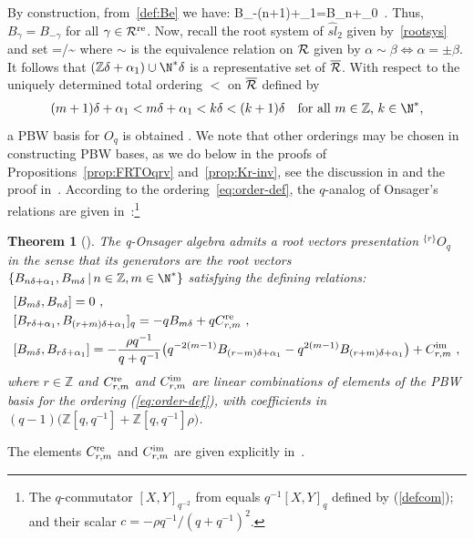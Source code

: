 \documentclass[11pt]{amsart}
\numberwithin{equation}{section}
\newtheorem{thm}{Theorem}[section]
\numberwithin{equation}{section}
\begin{document}
By construction, from~\eqref{def:Be} we have:
\beqa 
B_{-(n+1)\delta+\alpha_1}=B_{n\delta+\alpha_0}\ .\label{eq:BmBn}
\eeqa
Thus, $B_\gamma=B_{-\gamma}$ for all $\gamma\in{\mathcal R}^{\mathrm{re}}$.  Now, recall the root system of $\widehat{sl}_2$ given by~\eqref{rootsys} 
and set 
\beqa
\Rbar=\roots/\sim \label{eq:Rtilde}
\eeqa
 where $\sim$ is the equivalence relation on  ${\mathcal R}$ given by $\alpha \sim \beta \Leftrightarrow \alpha=\pm \beta$.
It follows that 
 $({\mathbb Z}\delta+\alpha_1)\cup \N^*\delta$  is a representative set of $\overline{{\mathcal R}}$. With respect to the uniquely determined total ordering $<$ on $\overline{{\mathcal R}}$ defined by
 \begin{align}\label{eq:order-def}
 	(m+1)\delta+\alpha_1<m\delta+\alpha_1<k\delta<(k+1)\delta \quad \mbox{for all $m\in {\mathbb Z}$, $k\in\N^*$},
 \end{align}  
a PBW basis for $O_q$ is obtained \cite[Thm.\,I]{BK17}. We note that other orderings may be chosen in constructing PBW bases, as we do below in the proofs of Propositions~\ref{prop:FRTOqrv} and~\ref{prop:Kr-inv},  see the discussion in \cite[Sec.\,5.1]{BK17} and the proof in~\cite[Thm.\,5.3]{Zh26b}.
According to the ordering~\eqref{eq:order-def}, the $q$-analog of Onsager's relations are given in~\cite[Thm.\,II]{BK17}:\footnote{The $q$-commutator $[X,Y]_{q^{-2}}$ from \cite{BK17} equals $q^{-1}[X,Y]_q$ defined by (\ref{defcom}); and their scalar $c = -\rho q^{-1}/(q+q^{-1})^2$.} 


\begin{thm}[\cite{BK17}]\label{thm:BK17}
  The q-Onsager algebra admits a root vectors presentation  $^{\{r\}}O_q$ in the sense that its generators are the root vectors $\{B_{n\delta+\alpha_1}, B_{m \delta} \, | \, n\in {\mathbb Z}, m\in \N^*\}$ satisfying the defining relations:
		\begin{align}
			& [B_{m\delta},B_{n\delta}]=0\ ,   \label{eq:qOnsCom1}\\
			& [B_{r\delta+\alpha_1}, B_{(r+m)\delta+\alpha_1}]_{q}=-qB_{m\delta}+ qC^{\real}_{r,m} \ , \label{eq:qOnsCom2}\\
			& [B_{m\delta},B_{r\delta+\alpha_1}] = -\frac{\rho q^{-1}}{q+q^{-1}} \big(q^{-2(m-1)} B_{(r-m)\delta+\alpha_1} 
			- q^{2(m-1)}B_{(r+m)\delta+\alpha_1}\big) + C^{\ima}_{r,m}\ , \label{eq:qOnsCom3}
		\end{align}
		where $r\in {\mathbb Z}$ and $C^{{\mathrm{re}}}_{r,m}$ and $C^{{\mathrm{im}}}_{r,m}$  are  linear combinations of elements of the PBW basis for the ordering (\ref{eq:order-def}), with coefficients in $(q-1)\big({\mathbb Z}[q,q^{-1}]+ {\mathbb Z}[q,q^{-1}]\rho\big)$.  
\end{thm}
The
elements $C^{{\mathrm{re}}}_{r,m}$ and $C^{{\mathrm{im}}}_{r,m}$ are given explicitly in~\cite[Props.\,5.5 \&~5.8]{BK17}.
\end{document}
